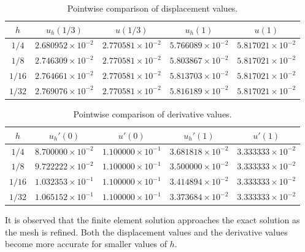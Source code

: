 \begin{table}[H]
\centering
\caption{Pointwise comparison of displacement values.}
\label{tab:q2_pointwise_disp}
\begingroup
\fontsize{13}{15}\selectfont
\renewcommand{\arraystretch}{1.18}
\begin{tabular}{c|cc|cc}
\hline
$h$ & $u_h(1/3)$ & $u(1/3)$ & $u_h(1)$ & $u(1)$ \\
\hline
$1/4$  & $2.680952\times 10^{-2}$ & $2.770581\times 10^{-2}$ & $5.766089\times 10^{-2}$ & $5.817021\times 10^{-2}$ \\
$1/8$  & $2.746309\times 10^{-2}$ & $2.770581\times 10^{-2}$ & $5.803867\times 10^{-2}$ & $5.817021\times 10^{-2}$ \\
$1/16$ & $2.764661\times 10^{-2}$ & $2.770581\times 10^{-2}$ & $5.813703\times 10^{-2}$ & $5.817021\times 10^{-2}$ \\
$1/32$ & $2.769076\times 10^{-2}$ & $2.770581\times 10^{-2}$ & $5.816189\times 10^{-2}$ & $5.817021\times 10^{-2}$ \\
\hline
\end{tabular}
\endgroup
\end{table}

\begin{table}[H]
\centering
\caption{Pointwise comparison of derivative values.}
\label{tab:q2_pointwise_deriv}
\begingroup
\fontsize{13}{15}\selectfont
\renewcommand{\arraystretch}{1.18}
\begin{tabular}{c|cc|cc}
\hline
$h$ & $u_h'(0)$ & $u'(0)$ & $u_h'(1)$ & $u'(1)$ \\
\hline
$1/4$  & $8.700000\times 10^{-2}$ & $1.100000\times 10^{-1}$ & $3.681818\times 10^{-2}$ & $3.333333\times 10^{-2}$ \\
$1/8$  & $9.722222\times 10^{-2}$ & $1.100000\times 10^{-1}$ & $3.500000\times 10^{-2}$ & $3.333333\times 10^{-2}$ \\
$1/16$ & $1.032353\times 10^{-1}$ & $1.100000\times 10^{-1}$ & $3.414894\times 10^{-2}$ & $3.333333\times 10^{-2}$ \\
$1/32$ & $1.065152\times 10^{-1}$ & $1.100000\times 10^{-1}$ & $3.373684\times 10^{-2}$ & $3.333333\times 10^{-2}$ \\
\hline
\end{tabular}
\endgroup
\end{table}

It is observed that the finite element solution approaches the exact solution as the mesh is refined. Both the displacement values and the derivative values become more accurate for smaller values of $h$.

